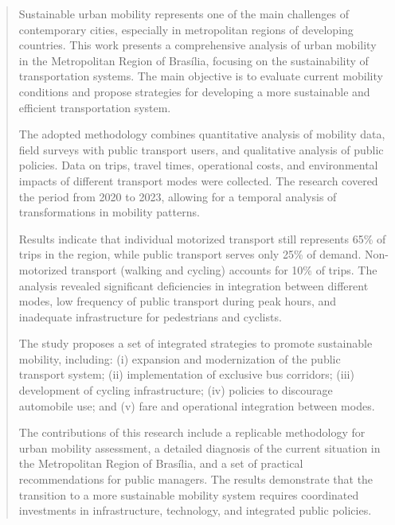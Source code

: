 \documentclass[mestrado,onehalfspacing,12pt,hyperref]{UnB-PPGT}
\begin{document}
\begin{abstract}
Sustainable urban mobility represents one of the main challenges of contemporary cities, especially in metropolitan regions of developing countries. This work presents a comprehensive analysis of urban mobility in the Metropolitan Region of Brasília, focusing on the sustainability of transportation systems. The main objective is to evaluate current mobility conditions and propose strategies for developing a more sustainable and efficient transportation system.

The adopted methodology combines quantitative analysis of mobility data, field surveys with public transport users, and qualitative analysis of public policies. Data on trips, travel times, operational costs, and environmental impacts of different transport modes were collected. The research covered the period from 2020 to 2023, allowing for a temporal analysis of transformations in mobility patterns.

Results indicate that individual motorized transport still represents 65\% of trips in the region, while public transport serves only 25\% of demand. Non-motorized transport (walking and cycling) accounts for 10\% of trips. The analysis revealed significant deficiencies in integration between different modes, low frequency of public transport during peak hours, and inadequate infrastructure for pedestrians and cyclists.

The study proposes a set of integrated strategies to promote sustainable mobility, including: (i) expansion and modernization of the public transport system; (ii) implementation of exclusive bus corridors; (iii) development of cycling infrastructure; (iv) policies to discourage automobile use; and (v) fare and operational integration between modes.

The contributions of this research include a replicable methodology for urban mobility assessment, a detailed diagnosis of the current situation in the Metropolitan Region of Brasília, and a set of practical recommendations for public managers. The results demonstrate that the transition to a more sustainable mobility system requires coordinated investments in infrastructure, technology, and integrated public policies.
\end{abstract}

\listoffigures

\listoftables
\end{document}
